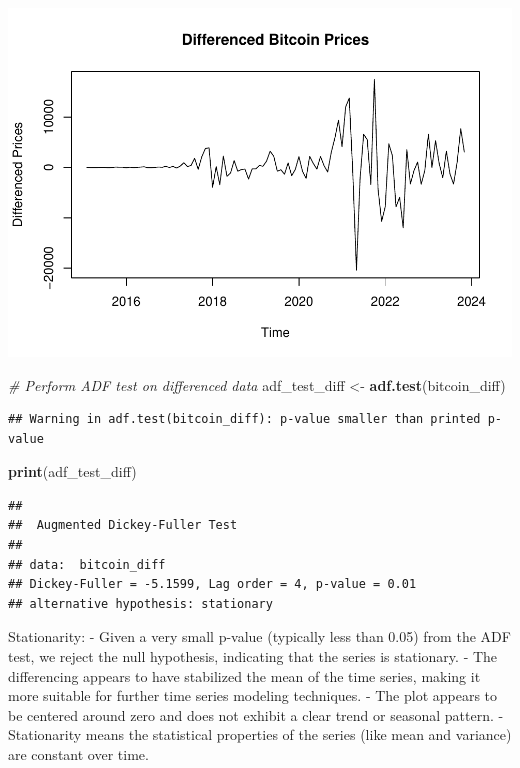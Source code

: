 \documentclass[
]{book}
\newenvironment{Shaded}{\begin{snugshade}}{\end{snugshade}}
\newcommand{\CommentTok}[1]{\textcolor[rgb]{0.56,0.35,0.01}{\textit{#1}}}
\newcommand{\FunctionTok}[1]{\textcolor[rgb]{0.13,0.29,0.53}{\textbf{#1}}}
\newcommand{\NormalTok}[1]{#1}
\newcommand{\OtherTok}[1]{\textcolor[rgb]{0.56,0.35,0.01}{#1}}
\begin{document}
\includegraphics{bookdown-demo_files/figure-latex/unnamed-chunk-38-1.pdf}

\begin{Shaded}
\begin{Highlighting}[]
\CommentTok{\# Perform ADF test on differenced data}
\NormalTok{adf\_test\_diff }\OtherTok{\textless{}{-}} \FunctionTok{adf.test}\NormalTok{(bitcoin\_diff)}
\end{Highlighting}
\end{Shaded}

\begin{verbatim}
## Warning in adf.test(bitcoin_diff): p-value smaller than printed p-value
\end{verbatim}

\begin{Shaded}
\begin{Highlighting}[]
\FunctionTok{print}\NormalTok{(adf\_test\_diff)}
\end{Highlighting}
\end{Shaded}

\begin{verbatim}
## 
##  Augmented Dickey-Fuller Test
## 
## data:  bitcoin_diff
## Dickey-Fuller = -5.1599, Lag order = 4, p-value = 0.01
## alternative hypothesis: stationary
\end{verbatim}

Stationarity:
- Given a very small p-value (typically less than 0.05) from the ADF test, we reject the null hypothesis, indicating that the series is stationary.
- The differencing appears to have stabilized the mean of the time series, making it more suitable for further time series modeling techniques.
- The plot appears to be centered around zero and does not exhibit a clear trend or seasonal pattern.
- Stationarity means the statistical properties of the series (like mean and variance) are constant over time.
\end{document}
